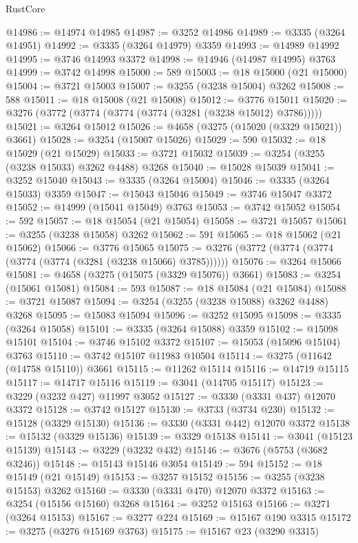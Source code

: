\begin{lexlean}{RustCore}
\begin{coremodule}
@14986 := @14974 @14985
@14987 := @3252 @14986
@14989 := @3335 (@3264 @14951)
@14992 := @3335 (@3264 @14979) @3359
@14993 := @14989 @14992
@14995 := @3746 @14993 @3372
@14998 := @14946 (@14987 @14995) @3763
@14999 := @3742 @14998
@15000 := 589
@15003 := @18 @15000 (@21 @15000)
@15004 := @3721 @15003
@15007 := @3255 (@3238 @15004) @3262
@15008 := 588
@15011 := @18 @15008 (@21 @15008)
@15012 := @3776 @15011
@15020 := @3276 (@3772 (@3774 (@3774 (@3774 (@3281 (@3238 @15012) @3786)))))
@15021 := @3264 @15012
@15026 := @4658 (@3275 (@15020 (@3329 @15021)) @3661)
@15028 := @3254 (@15007 @15026)
@15029 := 590
@15032 := @18 @15029 (@21 @15029)
@15033 := @3721 @15032
@15039 := @3254 (@3255 (@3238 @15033) @3262 @4488) @3268
@15040 := @15028 @15039
@15041 := @3252 @15040
@15043 := @3335 (@3264 @15004)
@15046 := @3335 (@3264 @15033) @3359
@15047 := @15043 @15046
@15049 := @3746 @15047 @3372
@15052 := @14999 (@15041 @15049) @3763
@15053 := @3742 @15052
@15054 := 592
@15057 := @18 @15054 (@21 @15054)
@15058 := @3721 @15057
@15061 := @3255 (@3238 @15058) @3262
@15062 := 591
@15065 := @18 @15062 (@21 @15062)
@15066 := @3776 @15065
@15075 := @3276 (@3772 (@3774 (@3774 (@3774 (@3774 (@3281 (@3238 @15066) @3785))))))
@15076 := @3264 @15066
@15081 := @4658 (@3275 (@15075 (@3329 @15076)) @3661)
@15083 := @3254 (@15061 @15081)
@15084 := 593
@15087 := @18 @15084 (@21 @15084)
@15088 := @3721 @15087
@15094 := @3254 (@3255 (@3238 @15088) @3262 @4488) @3268
@15095 := @15083 @15094
@15096 := @3252 @15095
@15098 := @3335 (@3264 @15058)
@15101 := @3335 (@3264 @15088) @3359
@15102 := @15098 @15101
@15104 := @3746 @15102 @3372
@15107 := @15053 (@15096 @15104) @3763
@15110 := @3742 @15107 @11983 @10504
@15114 := @3275 (@11642 (@14758 @15110)) @3661
@15115 := @11262 @15114
@15116 := @14719 @15115
@15117 := @14717 @15116
@15119 := @3041 (@14705 @15117)
@15123 := @3229 (@3232 @427) @11997 @3052
@15127 := @3330 (@3331 @437) @12070 @3372
@15128 := @3742 @15127
@15130 := @3733 (@3734 @230)
@15132 := @15128 (@3329 @15130)
@15136 := @3330 (@3331 @442) @12070 @3372
@15138 := @15132 (@3329 @15136)
@15139 := @3329 @15138
@15141 := @3041 (@15123 @15139)
@15143 := @3229 (@3232 @432)
@15146 := @3676 (@5753 (@3682 @3246))
@15148 := @15143 @15146 @3054
@15149 := 594
@15152 := @18 @15149 (@21 @15149)
@15153 := @3257 @15152
@15156 := @3255 (@3238 @15153) @3262
@15160 := @3330 (@3331 @470) @12070 @3372
@15163 := @3254 (@15156 @15160) @3268
@15164 := @3252 @15163
@15166 := @3271 (@3264 @15153)
@15167 := @3277 @224
@15169 := @15167 @190 @3315
@15172 := @3275 (@3276 @15169 @3763)
@15175 := @15167 @23 (@3290 @3315)

\end{coremodule}
\end{lexlean}

